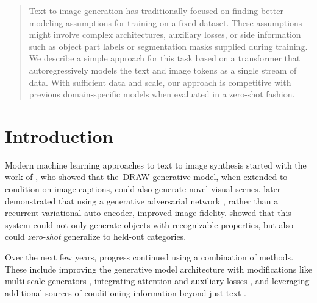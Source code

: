 \documentclass{article}
\begin{document}
\printAffiliationsAndNotice{}
\begin{abstract}
Text-to-image generation has traditionally focused on finding better modeling assumptions for training on a fixed dataset. These assumptions might involve complex architectures, auxiliary losses, or side information such as object part labels or segmentation masks supplied during training. We describe a simple approach for this task based on a transformer that autoregressively models the text and image tokens as a single stream of data. With sufficient data and scale, our approach is competitive with previous domain-specific models when evaluated in a zero-shot fashion.
\end{abstract}

\section{Introduction}
\label{intro}

Modern machine learning approaches to text to image synthesis started with the work of \citet{mansimov2015generating}, who showed that the~DRAW \citet{gregor2015draw} generative model, when extended to condition on image captions, could also generate novel visual scenes. \citet{reed2016generative} later demonstrated that using a generative adversarial network \citep{goodfellow2014generative}, rather than a recurrent variational auto-encoder, improved image fidelity. \citet{reed2016generative} showed that this system could not only generate objects with recognizable properties, but also could \textit{zero-shot} generalize to held-out categories.

Over the next few years, progress continued using a combination of methods. These include improving the generative model architecture with modifications like multi-scale generators \citep{zhang2017stackgan,zhang2018stackgan++}, integrating attention and auxiliary losses \citep{xu2018attngan}, and leveraging additional sources of conditioning information beyond just text \citep{reed2016learning,li2019object,koh2021text}.
\end{document}
